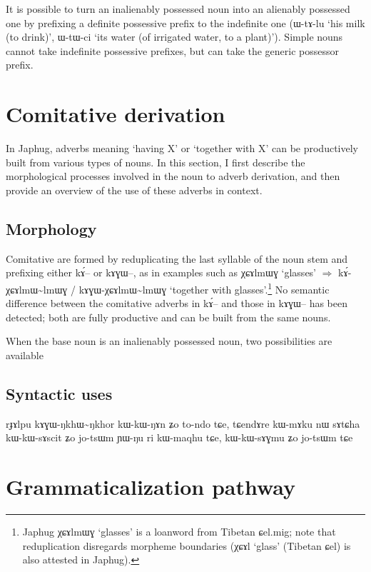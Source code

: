 \documentclass[oldfontcommands,oneside,a4paper,11pt]{article}
\newcommand{\ipa}[1]{{\phon #1}} %
\begin{document}
It is possible to turn an inalienably possessed noun into an alienably possessed one by prefixing a definite possessive prefix to the indefinite one (\ipa{ɯ-tɤ-lu} `his milk (to drink)', \ipa{ɯ-tɯ-ci} `its water (of irrigated water, to a plant)'). Simple nouns cannot take indefinite possessive prefixes, but can take the generic possessor prefix.
 
 \section{Comitative derivation} 
In Japhug, adverbs meaning `having X' or `together with X' can be productively built from various types of nouns. In this section, I first describe the morphological processes involved in the noun to adverb derivation, and then provide an overview of the use of these adverbs in context.

\subsection{Morphology}
Comitative are formed by reduplicating the last syllable of the noun stem and prefixing either \ipa{kɤ́--} or \ipa{kɤɣɯ--}, as in examples such as \ipa{χɕɤlmɯɣ} `glasses' $\Rightarrow$ \ipa{kɤ́-χɕɤlmɯ\textasciitilde{}lmɯɣ} / \ipa{kɤɣɯ-χɕɤlmɯ\textasciitilde{}lmɯɣ} `together with glasses'.\footnote{Japhug \ipa{χɕɤlmɯɣ} `glasses' is a loanword from Tibetan \ipa{ɕel.mig}; note that reduplication disregards morpheme boundaries (\ipa{χɕɤl} `glass' (Tibetan \ipa{ɕel}) is also attested in Japhug). } No semantic difference between the comitative adverbs in \ipa{kɤ́--} and those in \ipa{kɤɣɯ--} has been detected; both are fully productive and can be built from the same nouns.

When the base noun is an inalienably possessed noun, two possibilities are available

\subsection{Syntactic uses} 


\ipa{rɟɤlpu}  	\ipa{kɤɣɯ-ŋkhɯ\textasciitilde{}ŋkhor}  	\ipa{kɯ-kɯ-ŋɤn}  	\ipa{ʑo}  	\ipa{to-ndo}  	\ipa{tɕe,}  	\ipa{tɕendɤre}  	\ipa{kɯ-mɤku}  	\ipa{nɯ}  	\ipa{sɤtɕha}  	\ipa{kɯ-kɯ-sɤscit}  	\ipa{ʑo}  	\ipa{jo-tsɯm}  	\ipa{ɲɯ-ŋu}  	\ipa{ri}  	\ipa{kɯ-maqhu}  	\ipa{tɕe,}  	\ipa{kɯ-kɯ-sɤɣmu}  	\ipa{ʑo}  	\ipa{jo-tsɯm}  	\ipa{tɕe}  

\section{Grammaticalization pathway} 
\end{document}
